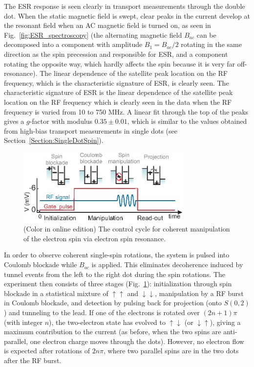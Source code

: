 \documentclass[12pt,aps,nofootinbib]{revtex4-1}
\begin{document}
The ESR response is seen clearly in transport measurements through
the double dot. When the static magnetic field is swept, clear
peaks in the current develop at the resonant field when an AC
magnetic field is turned on, as seen in
Fig.~\ref{fig:ESR_spectroscopy} (the alternating magnetic field
$B_{ac}$ can be decomposed into a component with amplitude
$B_1=B_{ac}/2$ rotating in the same direction as the spin
precession and responsible for ESR, and a component rotating the
opposite way, which hardly affects the spin because it is very far
off-resonance). The linear dependence of the satellite peak location on the RF frequency,
which is the characteristic signature of ESR, is clearly seen.
The characteristic signature of ESR is the linear dependence
of the satellite peak location on the RF frequency which is
clearly seen in the data when the RF frequency is varied from 10
to 750 MHz. A linear fit through the top of the peaks gives a
$g$-factor with modulus $0.35\pm0.01$, which is similar to the
values obtained from high-bias transport measurements in single
dots (see Section~\ref{Section:SingleDotSpin}).

\begin{figure}[htb]
\includegraphics[width=3.4in]{hanson_fig44.eps}
\caption{(Color in online edition) The control cycle for coherent manipulation of the
electron spin via electron spin resonance.}
\label{fig:ESR_Rabi_concept}
\end{figure}

In order to observe coherent single-spin rotations, the system is
pulsed into Coulomb blockade while $B_{ac}$ is applied. This
eliminates decoherence induced by tunnel events from the left to
the right dot during the spin rotations. The experiment then
consists of three stages (Fig.~\ref{fig:ESR_Rabi_concept}):
initialization through spin blockade in a statistical mixture of
$\uparrow\uparrow$ and $\downarrow\downarrow$, manipulation by a
RF burst in Coulomb blockade, and detection by pulsing back for
projection (onto $S(0,2)$) and tunneling to the lead. If one of
the electrons is rotated over $(2n+1)\pi$ (with integer $n$), the
two-electron state has evolved to $\uparrow\downarrow$ (or
$\downarrow\uparrow$), giving a maximum contribution to the
current (as before, when the two spins are anti-parallel, one
electron charge moves through the dots). However, no electron flow
is expected after rotations of $2n \pi$, where two parallel spins
are in the two dots after the RF burst.
\end{document}
